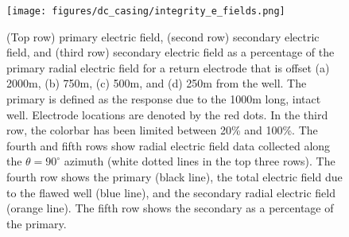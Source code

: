 \begin{figure}
    \begin{center}
    \texttt{[image: figures/dc\_casing/integrity\_e\_fields.png]}
    \end{center}
\caption{
    (Top row) primary electric field, (second row) secondary electric field,
    and (third row) secondary electric field as a percentage of the primary radial electric field
    for a return electrode that is offset (a) 2000m, (b) 750m, (c) 500m, and (d) 250m
    from the well. The primary is defined as the response due to the 1000m
    long, intact well. Electrode locations are denoted by
    the red dots. In the third row, the colorbar has been limited
    between 20\% and 100\%. The fourth and fifth rows show radial electric field data
    collected along the $\theta=90^\circ$ azimuth (white dotted lines in
    the top three rows). The fourth row shows the primary (black line), the total
    electric field due to the flawed well (blue line), and the secondary
    radial electric field (orange line). The fifth row shows the secondary as a
    percentage of the primary.
}
\label{fig:integrity_e_fields}
\end{figure}
